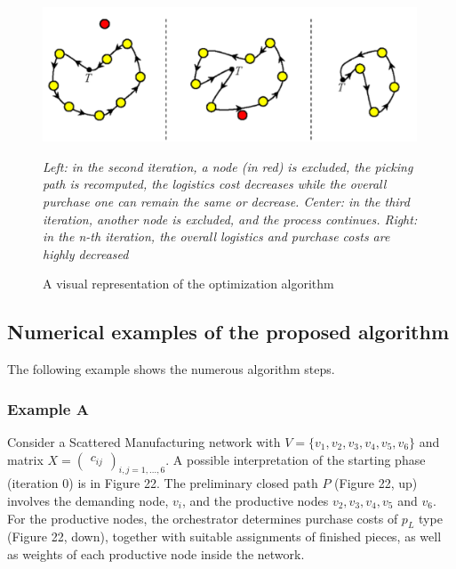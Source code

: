 \begin{figure}[h]
    \centering
    \includegraphics[height=4cm, keepaspectratio]{images/viz-repr-optim-alg}
    \caption{A visual representation of the optimization algorithm}
    \label{fig:viz-repr-optim-alg}
    \small{\textit{Left: in the second iteration, a node (in red) is excluded, the picking path is recomputed, the logistics cost decreases while the overall purchase one can remain the same or decrease. Center: in the third iteration, another node is excluded, and the process continues. Right: in the n-th iteration, the overall logistics and purchase costs are highly decreased}}
\end{figure}

\subsection{Numerical examples of the proposed algorithm}
The following example shows the numerous algorithm steps.
\subsubsection{Example A}
Consider a Scattered Manufacturing network with $V = \{v_1,v_2,v_3,v_4, v_5, v_6\}$ and matrix $X = \begin{pmatrix} c_{ij} \end{pmatrix} _{i,j=1,...,6}$. A possible interpretation of the starting phase (iteration 0) is in Figure 22. The preliminary closed path $P$ (Figure 22, up) involves the demanding node, $v_i$, and the productive nodes $v_2, v_3, v_4, v_5$ and $v_6$. For the productive nodes, the orchestrator determines purchase costs of $p_L$ type (Figure 22, down), together with suitable assignments of finished pieces, as well as weights of each productive node inside the network.

